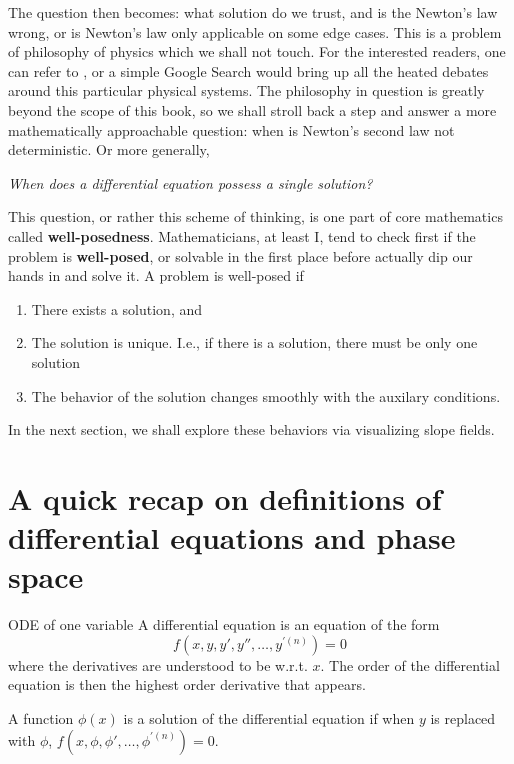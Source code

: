The question then becomes: what solution do we trust, and is the Newton's law wrong,
or is Newton's law only applicable on some edge cases. This is a problem of philosophy
of physics which we shall not touch. For the interested readers, one can refer to
\cite{malament-2008}, or a simple Google Search would bring up all the heated debates
around this particular physical systems. The philosophy in question is greatly beyond
the scope of this book, so we shall stroll back a step and answer a more mathematically
approachable question: when is Newton's second law not deterministic. Or more generally,
\begin{displayquote}
  \emph{When does a differential equation possess a single solution?}
\end{displayquote}

This question, or rather this scheme of thinking, is one part of core mathematics
called \textbf{well-posedness}. Mathematicians, at least I, tend to check first if the
problem is \textbf{well-posed}, or solvable in the first place before actually dip our
hands in and solve it. A problem is well-posed if
\begin{enumerate}
  \item There exists a solution, and
  \item The solution is unique. I.e., if there is a solution, there must be only one solution
  \item The behavior of the solution changes smoothly with the auxilary conditions.
\end{enumerate}
In the next section, we shall explore these behaviors via visualizing slope fields.

\section{A quick recap on definitions of differential equations and phase space}

\begin{df}{ODE of one variable}{}
  A differential equation is an equation of the form
  \begin{equation}
    f(x, y, y', y'', \dots, y^{'(n)}) = 0
  \end{equation}
  where the derivatives are understood to be w.r.t. \(x\). The order of the differential
  equation is then the highest order derivative that appears.

  A function \(\phi(x)\) is a solution of the differential equation if when \(y\) is
  replaced with \(\phi\), \(f(x, \phi, \phi', \dots, \phi^{'(n)}) = 0\).
\end{df}

